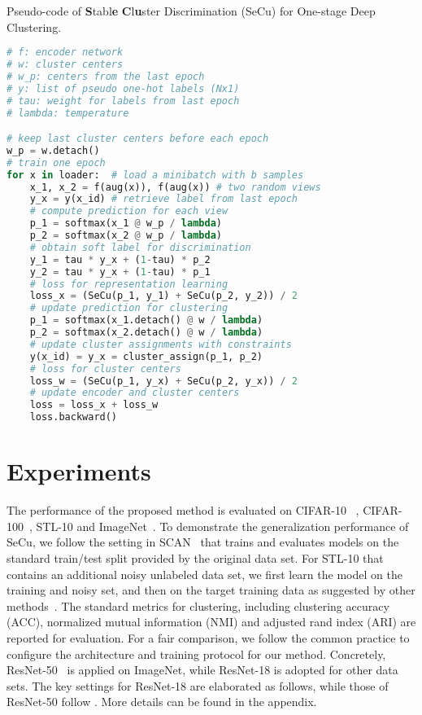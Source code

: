 \documentclass[10pt,twocolumn,letterpaper]{article}
\begin{document}
\begin{algorithm}[!ht]
\caption{Pseudo-code of \textbf{S}tabl\textbf{e} \textbf{C}l\textbf{u}ster Discrimination (SeCu) for One-stage Deep Clustering.}\label{alg:secu}
\label{alg:secu}
\begin{lstlisting}[language=python]
# f: encoder network
# w: cluster centers
# w_p: centers from the last epoch
# y: list of pseudo one-hot labels (Nx1)
# tau: weight for labels from last epoch
# lambda: temperature

# keep last cluster centers before each epoch
w_p = w.detach() 
# train one epoch
for x in loader:  # load a minibatch with b samples
    x_1, x_2 = f(aug(x)), f(aug(x)) # two random views
    y_x = y(x_id) # retrieve label from last epoch
    # compute prediction for each view
    p_1 = softmax(x_1 @ w_p / lambda)
    p_2 = softmax(x_2 @ w_p / lambda)
    # obtain soft label for discrimination
    y_1 = tau * y_x + (1-tau) * p_2 
    y_2 = tau * y_x + (1-tau) * p_1
    # loss for representation learning
    loss_x = (SeCu(p_1, y_1) + SeCu(p_2, y_2)) / 2
    # update prediction for clustering
    p_1 = softmax(x_1.detach() @ w / lambda)
    p_2 = softmax(x_2.detach() @ w / lambda)
    # update cluster assignments with constraints
    y(x_id) = y_x = cluster_assign(p_1, p_2) 
    # loss for cluster centers
    loss_w = (SeCu(p_1, y_x) + SeCu(p_2, y_x)) / 2
    # update encoder and cluster centers
    loss = loss_x + loss_w
    loss.backward() 
\end{lstlisting}
\end{algorithm}
 

\section{Experiments}
The performance of the proposed method is evaluated on CIFAR-10~\cite{krizhevsky2009learning} , CIFAR-100~\cite{krizhevsky2009learning}, STL-10\cite{CoatesNL11} and ImageNet~\cite{RussakovskyDSKS15}. To demonstrate the generalization performance of SeCu, we follow the setting in SCAN~\cite{GansbekeVGPG20} that trains and evaluates models on the standard train/test split provided by the original data set. For STL-10 that contains an additional noisy unlabeled data set, we first learn the model on the training and noisy set, and then on the target training data as suggested by other methods~\cite{GansbekeVGPG20,ZhongW0HDNL021}. The standard metrics for clustering, including clustering accuracy (ACC), normalized mutual information (NMI) and adjusted rand index (ARI) are reported for evaluation. For a fair comparison, we follow the common practice to configure the architecture and training protocol for our method. Concretely, ResNet-50~\cite{HeZRS16} is applied on ImageNet, while ResNet-18 is adopted for other data sets. The key settings for ResNet-18 are elaborated as follows, while those of ResNet-50 follow \cite{coke}. More details can be found in the appendix.
\end{document}
